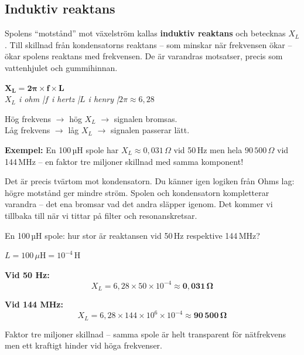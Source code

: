 \documentclass[a4paper,11pt,twoside]{book}
\newcommand{\emoji}[1]{{\emojifont #1}}
\begin{document}
\subsection{Induktiv reaktans}

Spolens ``motstånd'' mot växelström kallas \textbf{induktiv 
reaktans} och betecknas $X_L$. Till skillnad från 
kondensatorns reaktans -- som minskar när frekvensen ökar 
-- ökar spolens reaktans med frekvensen. De är varandras 
motsatser, precis som vattenhjulet och gummihinnan.

\begin{formulabox}
{\large$\mathbf{X_L = 2\pi \times f \times L}$}\\[3mm]
{\small\normalfont\itshape $X_L$ i ohm \quad|\quad $f$ i hertz \quad|\quad $L$ i henry \quad|\quad $2\pi \approx 6{,}28$}
\end{formulabox}

\begin{bluebox}[title={\emoji{🔑} Nyckelsamband -- reaktansen ökar när frekvensen ökar}]
Hög frekvens $\rightarrow$ hög $X_L$ $\rightarrow$ signalen bromsas.\\
Låg frekvens $\rightarrow$ låg $X_L$ $\rightarrow$ signalen passerar lätt.

\medskip
\textbf{Exempel:} En 100\,µH spole har $X_L \approx 
0{,}031\,\Omega$ vid 50\,Hz men hela $90\,500\,\Omega$ 
vid 144\,MHz -- en faktor tre miljoner skillnad med 
samma komponent!
\end{bluebox}

Det är precis tvärtom mot kondensatorn. Du känner igen 
logiken från Ohms lag: högre motstånd ger mindre ström. 
Spolen och kondensatorn kompletterar varandra -- det ena 
bromsar vad det andra släpper igenom. Det kommer vi 
tillbaka till när vi tittar på filter och resonanskretsar.

\begin{worked}[title={Räkneexempel 1.5.2-1 -- Reaktans vid två frekvenser}]
En 100\,µH spole: hur stor är reaktansen vid 50\,Hz 
respektive 144\,MHz?

$L = 100\,\mu\text{H} = 10^{-4}\,\text{H}$

\textbf{Vid 50 Hz:}
\[ X_L = 6{,}28 \times 50 \times 10^{-4} \approx \mathbf{0{,}031\,\Omega} \]

\textbf{Vid 144 MHz:}
\[ X_L = 6{,}28 \times 144 \times 10^6 \times 10^{-4} \approx \mathbf{90\,500\,\Omega} \]

Faktor tre miljoner skillnad -- samma spole är helt 
transparent för nätfrekvens men ett kraftigt hinder 
vid höga frekvenser.
\end{worked}
\end{document}
